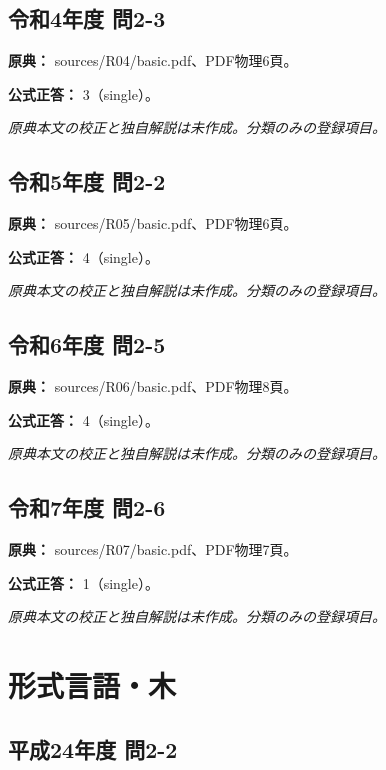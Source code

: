 \subsection{令和4年度 問2-3}
\label{q:r04-reg-basic-2-3}

\noindent\textbf{原典：} sources/R04/basic.pdf、PDF物理6頁。

\textbf{公式正答：} 3（single）。

\par\textit{原典本文の校正と独自解説は未作成。分類のみの登録項目。}

\subsection{令和5年度 問2-2}
\label{q:r05-reg-basic-2-2}

\noindent\textbf{原典：} sources/R05/basic.pdf、PDF物理6頁。

\textbf{公式正答：} 4（single）。

\par\textit{原典本文の校正と独自解説は未作成。分類のみの登録項目。}

\subsection{令和6年度 問2-5}
\label{q:r06-reg-basic-2-5}

\noindent\textbf{原典：} sources/R06/basic.pdf、PDF物理8頁。

\textbf{公式正答：} 4（single）。

\par\textit{原典本文の校正と独自解説は未作成。分類のみの登録項目。}

\subsection{令和7年度 問2-6}
\label{q:r07-reg-basic-2-6}

\noindent\textbf{原典：} sources/R07/basic.pdf、PDF物理7頁。

\textbf{公式正答：} 1（single）。

\par\textit{原典本文の校正と独自解説は未作成。分類のみの登録項目。}

\section{形式言語・木}

\subsection{平成24年度 問2-2}
\label{q:h24-reg-basic-2-2}

